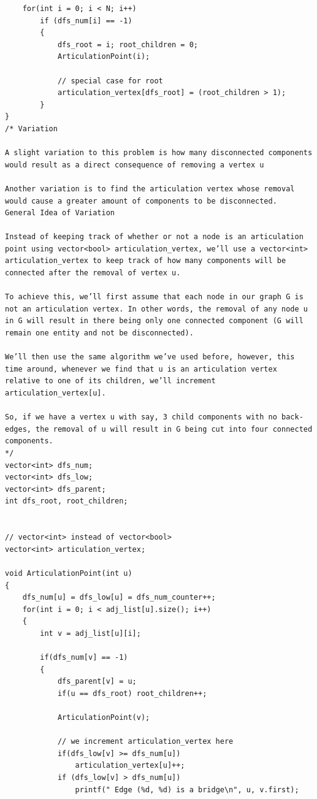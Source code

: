 \documentclass[8pt, a4paper, oneside, twocolumn]{extarticle}
\begin{document}
\begin{itemize}
\begin{verbatim}
    for(int i = 0; i < N; i++)
        if (dfs_num[i] == -1)
        {
            dfs_root = i; root_children = 0;
            ArticulationPoint(i);
            
            // special case for root
            articulation_vertex[dfs_root] = (root_children > 1);
        }
}
/* Variation

A slight variation to this problem is how many disconnected components would result as a direct consequence of removing a vertex u

Another variation is to find the articulation vertex whose removal would cause a greater amount of components to be disconnected.
General Idea of Variation

Instead of keeping track of whether or not a node is an articulation point using vector<bool> articulation_vertex, we’ll use a vector<int> articulation_vertex to keep track of how many components will be connected after the removal of vertex u.

To achieve this, we’ll first assume that each node in our graph G is not an articulation vertex. In other words, the removal of any node u in G will result in there being only one connected component (G will remain one entity and not be disconnected).

We’ll then use the same algorithm we’ve used before, however, this time around, whenever we find that u is an articulation vertex relative to one of its children, we’ll increment articulation_vertex[u].

So, if we have a vertex u with say, 3 child components with no back-edges, the removal of u will result in G being cut into four connected components.
*/
vector<int> dfs_num;
vector<int> dfs_low;
vector<int> dfs_parent;
int dfs_root, root_children;


// vector<int> instead of vector<bool>
vector<int> articulation_vertex;

void ArticulationPoint(int u)
{
    dfs_num[u] = dfs_low[u] = dfs_num_counter++;
    for(int i = 0; i < adj_list[u].size(); i++)
    {
        int v = adj_list[u][i];
        
        if(dfs_num[v] == -1)
        {
            dfs_parent[v] = u;
            if(u == dfs_root) root_children++;

            ArticulationPoint(v);
            
            // we increment articulation_vertex here
            if(dfs_low[v] >= dfs_num[u])
                articulation_vertex[u]++;
            if (dfs_low[v] > dfs_num[u])
                printf(" Edge (%d, %d) is a bridge\n", u, v.first);
                

\end{verbatim}
\end{itemize}
\end{document}
